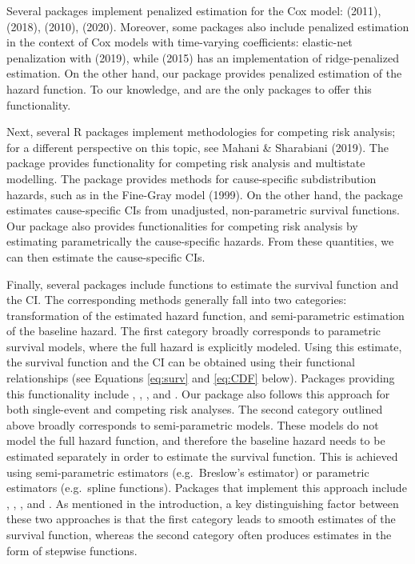 Several packages implement penalized estimation for the Cox model:  (2011),  (2018),  (2010),  (2020). Moreover, some packages also include penalized estimation in the context of Cox models with time-varying coefficients: elastic-net penalization with  (2019), while  (2015) has an implementation of ridge-penalized estimation. On the other hand, our package  provides penalized estimation of the hazard function. To our knowledge,  and  are the only packages to offer this functionality.

Next, several R packages implement methodologies for competing risk analysis; for a different perspective on this topic, see Mahani \& Sharabiani (2019). The package  provides functionality for competing risk analysis and multistate modelling. The package  provides methods for cause-specific subdistribution hazards, such as in the Fine-Gray model (1999). On the other hand, the package  estimates cause-specific CIs from unadjusted, non-parametric survival functions. Our package  also provides functionalities for competing risk analysis by estimating parametrically the cause-specific hazards. From these quantities, we can then estimate the cause-specific CIs.

Finally, several packages include functions to estimate the survival function and the CI. The corresponding methods generally fall into two categories: transformation of the estimated hazard function, and semi-parametric estimation of the baseline hazard. The first category broadly corresponds to parametric survival models, where the full hazard is explicitly modeled. Using this estimate, the survival function and the CI can be obtained using their functional relationships (see Equations \eqref{eq:surv} and \eqref{eq:CDF} below). Packages providing this functionality include , , , and . Our package  also follows this approach for both single-event and competing risk analyses. The second category outlined above broadly corresponds to semi-parametric models. These models do not model the full hazard function, and therefore the baseline hazard needs to be estimated separately in order to estimate the survival function. This is achieved using semi-parametric estimators (e.g.~Breslow's estimator) or parametric estimators (e.g.~spline functions). Packages that implement this approach include , , , and . As mentioned in the introduction, a key distinguishing factor between these two approaches is that the first category leads to smooth estimates of the survival function, whereas the second category often produces estimates in the form of stepwise functions.

